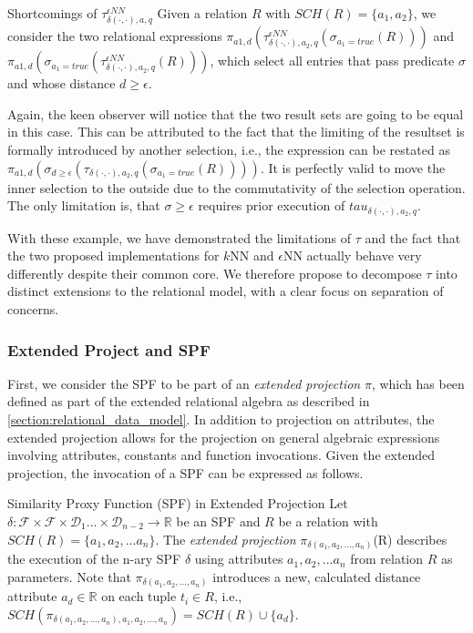 \begin{example}[label=example:limitsoftauepsilonnn]{Shortcomings of $\tau^{\epsilon NN}_{\delta(\cdot,\cdot),a,q}$}{}
    Given a relation $R$ with $SCH(R) = \{ a_1, a_2 \}$, we consider the two relational expressions $\pi_{a1,d}(\tau^{\epsilon NN}_{\delta(\cdot,\cdot),a_2,q}(\sigma_{a_1 = true}(R)))$ and $\pi_{a1,d}(\sigma_{a_1 = true}(\tau^{\epsilon  NN}_{\delta(\cdot,\cdot),a_2,q}(R)))$, which select all entries that pass predicate $\sigma$ and whose distance $d \geq \epsilon$.
    
    Again, the keen observer will notice that the two result sets are going to be equal in this case. This can be attributed to the fact that the limiting of the resultset is formally introduced by another selection, i.e., the expression can be restated as $\pi_{a1,d}(\sigma_{d \geq \epsilon}(\tau_{\delta(\cdot,\cdot),a_2,q}(\sigma_{a_1 = true}(R))))$. It is perfectly valid to move the inner selection to the outside due to the commutativity of the selection operation. The only limitation is, that  $\sigma \geq \epsilon$ requires prior execution of $tau_{\delta(\cdot,\cdot),a_2,q}$.
\end{example}

With these example, we have demonstrated the limitations of $\tau$ and the fact that the two proposed implementations for $k$NN and $\epsilon$NN actually behave very differently despite their common core. We therefore propose to decompose $\tau$ into distinct extensions to the relational model, with a clear focus on separation of concerns.

\subsubsection{Extended Project and SPF}

First, we consider the SPF to be part of an \emph{extended projection} $\pi$, which has been defined as part of the extended relational algebra as described in \cref{section:relational_data_model}. In addition to projection on attributes, the extended projection allows for the projection on general algebraic expressions involving attributes, constants and function invocations. Given the extended projection, the invocation of a SPF can be expressed as follows.

\begin{definition}[label=definition:spf_rel]{Similarity Proxy Function (SPF) in Extended Projection}{}
Let $\delta \colon \mathcal{F} \times \mathcal{F} \times \mathcal{D}_{1} ... \times \mathcal{D}_{n-2} \to \mathbb{R}$ be an SPF and $R$ be a relation with $SCH(R) = \{ a_1, a_2, ... a_{n} \}$. The \emph{extended projection} $\pi_{\delta(a_1,a_2,...,a_n)}$(R) describes
the execution of the n-ary SPF $\delta$ using attributes $a_1,a_2,...a_n$ from relation $R$ as parameters. Note that $\pi_{\delta(a_1,a_2,...,a_n)}$ introduces a new, calculated distance attribute $a_d \in \mathbb{R}$ on each tuple $t_i \in R$, i.e., $SCH(\pi_{\delta(a_1,a_2,...,a_n), a_1, a_2, ..., a_n}) = SCH(R) \cup \{ a_d \}$.
\end{definition}




